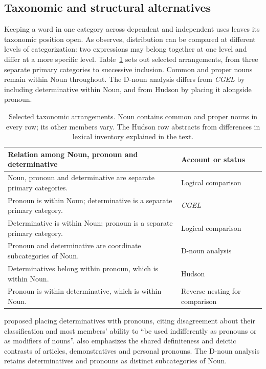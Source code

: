 \documentclass[12pt]{article}
\begin{document}
\subsection{Taxonomic and structural alternatives}\label{sec:related}

Keeping a word in one category across dependent and independent uses leaves its taxonomic position open. As \textcite[232--235]{lyons1968} observes, distribution can be compared at different levels of categorization: two expressions may belong together at one level and differ at a more specific level. Table~\ref{tab:rivals} sets out selected arrangements, from three separate primary categories to successive inclusion. Common and proper nouns remain within Noun throughout. The D-noun analysis differs from \textit{CGEL} by including determinative within Noun, and from Hudson by placing it alongside pronoun.

\begin{table}[H]
\centering\small
\caption{Selected taxonomic arrangements. Noun contains common and proper nouns in every row; its other members vary. The Hudson row abstracts from differences in lexical inventory explained in the text.}\label{tab:rivals}
\begin{tabular}{>{\raggedright\arraybackslash}p{8.7cm}>{\raggedright\arraybackslash}p{3cm}}
\toprule
Relation among Noun, pronoun and determinative & Account or status \\
\midrule
Noun, pronoun and determinative are separate primary categories. & Logical comparison \\
Pronoun is within Noun; determinative is a separate primary category. & \textit{CGEL} \\
Determinative is within Noun; pronoun is a separate primary category. & Logical comparison \\
Pronoun and determinative are coordinate subcategories of Noun. & D-noun analysis \\
Determinatives belong within pronoun, which is within Noun. & Hudson \\
Pronoun is within determinative, which is within Noun. & Reverse nesting for comparison \\
\bottomrule
\end{tabular}
\end{table}

\textcite[24]{palmer1924} proposed placing determinatives with pronouns, citing disagreement about their classification and most members' ability to \enquote{be used indifferently as pronouns or as modifiers of nouns}. \textcite[279]{lyons1968} also emphasizes the shared definiteness and deictic contrasts of articles, demonstratives and personal pronouns. The D-noun analysis retains determinatives and pronouns as distinct subcategories of Noun.
\end{document}
